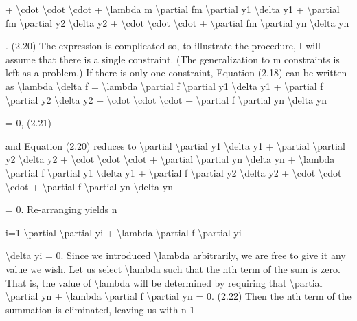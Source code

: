 + \textbackslash{}cdot  \textbackslash{}cdot  \textbackslash{}cdot  + \textbackslash{}lambda m
\textbackslash{}partial fm
\textbackslash{}partial y1
\textbackslash{}delta y1 + \textbackslash{}partial fm
\textbackslash{}partial y2
\textbackslash{}delta y2 + \textbackslash{}cdot  \textbackslash{}cdot  \textbackslash{}cdot  + \textbackslash{}partial fm
\textbackslash{}partial yn
\textbackslash{}delta yn

.
(2.20)
The expression is complicated so, to illustrate the procedure, I will assume
that there is a single constraint. (The generalization to m constraints is left as
a problem.) If there is only one constraint, Equation (2.18) can be written as
\textbackslash{}lambda \textbackslash{}delta f = \textbackslash{}lambda
\textbackslash{}partial f
\textbackslash{}partial y1
\textbackslash{}delta y1 + \textbackslash{}partial f
\textbackslash{}partial y2
\textbackslash{}delta y2 + \textbackslash{}cdot  \textbackslash{}cdot  \textbackslash{}cdot  + \textbackslash{}partial f
\textbackslash{}partial yn
\textbackslash{}delta yn

= 0,
(2.21)

and Equation (2.20) reduces to
\textbackslash{}partial
\textbackslash{}partial y1
\textbackslash{}delta y1 + \textbackslash{}partial
\textbackslash{}partial y2
\textbackslash{}delta y2 + \textbackslash{}cdot  \textbackslash{}cdot  \textbackslash{}cdot  + \textbackslash{}partial
\textbackslash{}partial yn
\textbackslash{}delta yn
+ \textbackslash{}lambda
\textbackslash{}partial f
\textbackslash{}partial y1
\textbackslash{}delta y1 + \textbackslash{}partial f
\textbackslash{}partial y2
\textbackslash{}delta y2 + \textbackslash{}cdot  \textbackslash{}cdot  \textbackslash{}cdot  + \textbackslash{}partial f
\textbackslash{}partial yn
\textbackslash{}delta yn

= 0.
Re-arranging yields
n

i=1
\textbackslash{}partial
\textbackslash{}partial yi
+ \textbackslash{}lambda  \textbackslash{}partial f
\textbackslash{}partial yi

\textbackslash{}delta yi = 0.
Since we introduced \textbackslash{}lambda  arbitrarily, we are free to give it any value we wish. Let
us select \textbackslash{}lambda  such that the nth term of the sum is zero. That is, the value of \textbackslash{}lambda  will
be determined by requiring that
\textbackslash{}partial
\textbackslash{}partial yn
+ \textbackslash{}lambda  \textbackslash{}partial f
\textbackslash{}partial yn
= 0.
(2.22)
Then the nth term of the summation is eliminated, leaving us with
n-1


